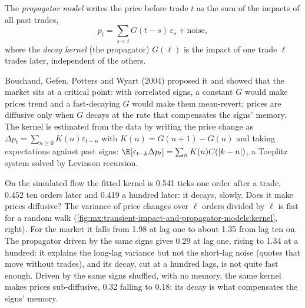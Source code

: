 \begin{definition}\label{def:mx:transient-impact-and-propagator-models:propagator}
The \emph{propagator model} writes the price before trade $t$ as the sum of the impacts of all past trades,
\[
p_t=\sum_{s<t}G(t-s)\,\varepsilon_s+\text{noise},
\]
where the \emph{decay kernel} (the propagator) $G(\ell)$ is the impact of one trade $\ell$ trades later, independent of the others.
\end{definition}

Bouchaud, Gefen, Potters and Wyart (2004) proposed it and showed that the market sits at a critical point: with correlated signs, a constant $G$ would make
prices trend and a fast-decaying $G$ would make them mean-revert; prices are diffusive only when $G$ decays at the rate that compensates the signs' memory.
The kernel is estimated from the data by writing the price change as $\Delta p_t=\sum_{n\ge0}K(n)\varepsilon_{t-n}$ with $K(n)=G(n+1)-G(n)$ and taking
expectations against past signs: $\E[\varepsilon_{t-k}\Delta p_t]=\sum_nK(n)C(|k-n|)$, a Toeplitz system solved by Levinson recursion.

\label{lst:mx:transient-impact-and-propagator-models:fit}

On the simulated flow the fitted kernel is 0.541 ticks one order after a trade, 0.452 ten orders later and 0.419 a hundred later: it decays, slowly. Does
it make prices diffusive? The variance of price changes over $\ell$ orders divided by $\ell$ is flat for a random walk
(\cref{fig:mx:transient-impact-and-propagator-models:kernel}, right). For the market it falls from 1.98 at lag one to about 1.35 from lag ten on. The
propagator driven by the same signs gives 0.29 at lag one, rising to 1.34 at a hundred: it explains the long-lag variance but not the short-lag noise
(quotes that move without trades), and its decay, cut at a hundred lags, is not quite fast enough. Driven by the same signs shuffled, with no memory, the
same kernel makes prices sub-diffusive, 0.32 falling to 0.18: its decay is what compensates the signs' memory.

